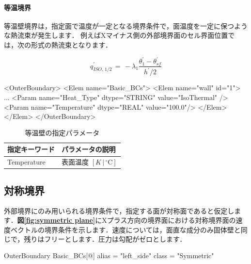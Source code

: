 %
\paragraph{等温境界}

等温壁境界は，指定面で温度が一定となる境界条件で，面温度を一定に保つような熱流束が発生します．
例えばXマイナス側の外部境界面のセル界面位置では，次の形式の熱流束となります．

\begin{equation}
q^{\prime}_{ISO,\,1/2} \,=\, -\mathit{\lambda}_1 \frac{\mathit{\theta}^{\prime}_1 - \mathit{\theta}^{\prime}_{sf}} {h^{\prime}\slash{2}}
\label{eq:qiso1}
\end{equation}

{\small
\begin{program}
<OuterBoundary>
  <Elem name="Basic_BCs">
    <Elem name="wall" id="1">
      ...
      <Param name="Heat_Type"   dtype="STRING" value="IsoThermal" />
      <Param name="Temperature" dtype="REAL"   value="100.0"/>
    </Elem>
  </Elem>
</OuterBoundary>
\end{program}
}

\begin{table}[htdp]
\caption{等温壁の指定パラメータ}
\begin{center}
\small
\begin{tabular}{ll} \toprule
指定キーワード & パラメータの説明\\ \midrule
Temperature & 表面温度 $[K\,|\,{}^\circ\mathrm{C}]$\\
\bottomrule
\end{tabular}
\end{center}
\label{tbl:iso-thermal}
\end{table}


\pagebreak
\subsection{対称境界}

外部境界にのみ用いられる境界条件で，指定する面が対称面であると仮定します．\textbf{図\ref{fig:symmetric plane}}にXプラス方向の境界面における対称境界面の速度ベクトルの境界条件を示します．速度については，面直な成分のみ固体壁と同じで，残りはフリーとします．圧力は勾配がゼロとします．


{\small
\begin{program}
OuterBoundary {
  Basic_BCs[@] {
    alias    = "left_side"
    class    = "Symmetric"
  }
}
\end{program}
}


